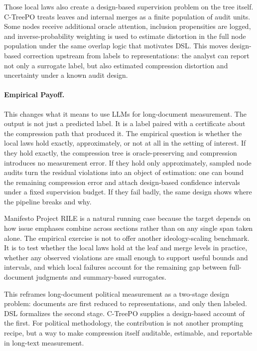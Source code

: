 \documentclass[11pt]{article}
\begin{document}
Those local laws also create a design-based supervision problem on the tree itself. C-TreePO treats leaves and internal merges as a finite population of audit units. Some nodes receive additional oracle attention, inclusion propensities are logged, and inverse-probability weighting is used to estimate distortion in the full node population under the same overlap logic that motivates DSL. This moves design-based correction upstream from labels to representations: the analyst can report not only a surrogate label, but also estimated compression distortion and uncertainty under a known audit design.

\paragraph{Empirical Payoff.}
This changes what it means to use LLMs for long-document measurement. The output is not just a predicted label. It is a label paired with a certificate about the compression path that produced it. The empirical question is whether the local laws hold exactly, approximately, or not at all in the setting of interest. If they hold exactly, the compression tree is oracle-preserving and compression introduces no measurement error. If they hold only approximately, sampled node audits turn the residual violations into an object of estimation: one can bound the remaining compression error and attach design-based confidence intervals under a fixed supervision budget. If they fail badly, the same design shows where the pipeline breaks and why.

Manifesto Project RILE is a natural running case because the target depends on how issue emphases combine across sections rather than on any single span taken alone. The empirical exercise is not to offer another ideology-scaling benchmark. It is to test whether the local laws hold at the leaf and merge levels in practice, whether any observed violations are small enough to support useful bounds and intervals, and which local failures account for the remaining gap between full-document judgments and summary-based surrogates.

This reframes long-document political measurement as a two-stage design problem: documents are first reduced to representations, and only then labeled. DSL formalizes the second stage. C-TreePO supplies a design-based account of the first. For political methodology, the contribution is not another prompting recipe, but a way to make compression itself auditable, estimable, and reportable in long-text measurement.

\clearpage

{\small}
\end{document}
